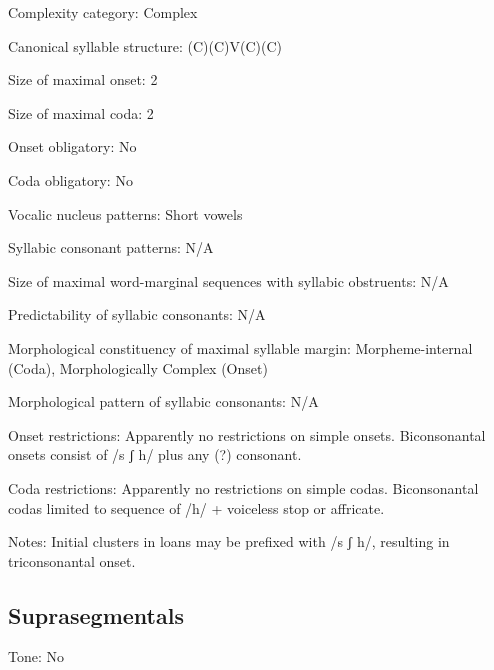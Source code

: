 {\begin{appendixdesc}
\item[Complexity category:] Complex

\item[Canonical syllable structure:] (C)(C)V(C)(C) \citep[9--15]{Kaufman1971}

\item[Size of maximal onset:] 2

\item[Size of maximal coda:] 2

\item[Onset obligatory:] No

\item[Coda obligatory:] No

\item[Vocalic nucleus patterns:] Short vowels

\item[Syllabic consonant patterns:] N/A

\item[Size of maximal word-marginal sequences with syllabic obstruents:] N/A

\item[Predictability of syllabic consonants:] N/A

\item[Morphological constituency of maximal syllable margin:] Morpheme-internal (Coda), Morphologically Complex (Onset)

\item[Morphological pattern of syllabic consonants:] N/A

\item[Onset restrictions:] Apparently no restrictions on simple onsets. Biconsonantal onsets consist of /s ʃ h/ plus any (?) consonant.

\item[Coda restrictions:] Apparently no restrictions on simple codas. Biconsonantal codas limited to sequence of /h/ + voiceless stop or affricate.

\item[Notes:] Initial clusters in  loans may be prefixed with /s ʃ h/, resulting in triconsonantal onset.
\end{appendixdesc}
\subsection*{Suprasegmentals}
\begin{appendixdesc}
\item[Tone:] No


\end{appendixdesc}}
